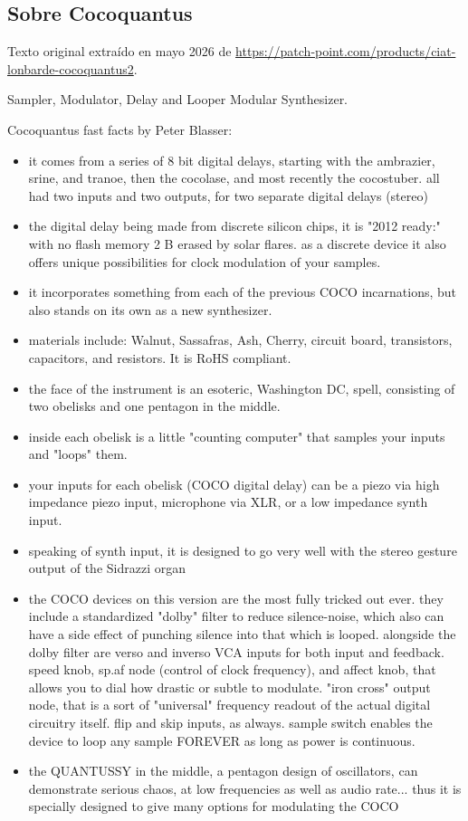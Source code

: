 \newpage

\subsection{Sobre Cocoquantus}

Texto original extraído en mayo 2026 de \url{https://patch-point.com/products/ciat-lonbarde-cocoquantus2}.

Sampler, Modulator, Delay and Looper Modular Synthesizer.

Cocoquantus fast facts by Peter Blasser:

\begin{itemize}
	\item it comes from a series of 8 bit digital delays, starting with the ambrazier, srine, and tranoe, then the cocolase, and most recently the cocostuber. all had two inputs and two outputs, for two separate digital delays (stereo)
	\item the digital delay being made from discrete silicon chips, it is "2012 ready:" with no flash memory 2 B erased by solar flares. as a discrete device it also offers unique possibilities for clock modulation of your samples.
	\item it incorporates something from each of the previous COCO incarnations, but also stands on its own as a new synthesizer.
	\item materials include: Walnut, Sassafras, Ash, Cherry, circuit board, transistors, capacitors, and resistors. It is RoHS compliant.
	\item the face of the instrument is an esoteric, Washington DC, spell, consisting of two obelisks and one pentagon in the middle.
	\item inside each obelisk is a little "counting computer" that samples your inputs and "loops" them.
	\item your inputs for each obelisk (COCO digital delay) can be a piezo via high impedance piezo input, microphone via XLR, or a low impedance synth input.
	\item speaking of synth input, it is designed to go very well with the stereo gesture output of the Sidrazzi organ 
	\item the COCO devices on this version are the most fully tricked out ever. they include a standardized "dolby" filter to reduce silence-noise, which also can have a side effect of punching silence into that which is looped. alongside the dolby filter are verso and inverso VCA inputs for both input and feedback. speed knob, sp.af node (control of clock frequency), and affect knob, that allows you to dial how drastic or subtle to modulate. "iron cross" output node, that is a sort of "universal" frequency readout of the actual digital circuitry itself. flip and skip inputs, as always. sample switch enables the device to loop any sample FOREVER as long as power is continuous.
	\item the QUANTUSSY in the middle, a pentagon design of oscillators, can demonstrate serious chaos, at low frequencies as well as audio rate... thus it is specially designed to give many options for modulating the COCO
\end{itemize}

